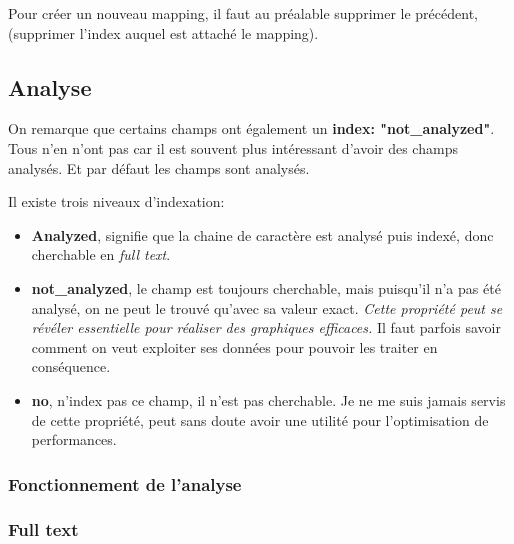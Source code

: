 Pour créer un nouveau mapping, il faut au préalable supprimer le précédent, (supprimer 
l'index auquel est attaché le mapping).




\subsection{Analyse}
On remarque que certains champs ont également un \textbf{index: "not\_analyzed"}.
Tous n'en n'ont pas car il est souvent plus intéressant d'avoir des champs analysés.
Et par défaut les champs sont analysés.

Il existe trois niveaux d'indexation:
\begin{itemize}
    \item   \textbf{Analyzed}, signifie que la chaine de caractère est analysé puis indexé,
    donc cherchable en \textit{full text}.
    \item   \textbf{not\_analyzed}, le champ est toujours cherchable, mais puisqu'il n'a pas 
    été analysé, on ne peut le trouvé qu'avec sa valeur exact. \emph{Cette propriété
    peut se révéler essentielle pour réaliser des graphiques efficaces.} 
    \footnotesize{Il faut parfois savoir comment on veut exploiter ses données pour
    pouvoir les traiter en conséquence.}
    \item \textbf{no}, n'index pas ce champ, il n'est pas cherchable. Je ne me suis
    jamais servis de cette propriété, peut sans doute avoir une utilité pour l'optimisation
    de performances.
\end{itemize}

\subsubsection{Fonctionnement de l'analyse}

\subsubsection{Full text}

